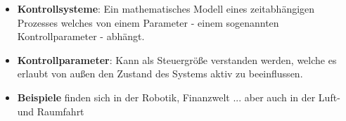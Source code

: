 \documentclass{beamer}
\begin{document}
\begin{frame}
\begin{columns}
				\begin{column}{0.58\textwidth}
					\begin{itemize}
						\item \textbf{Kontrollsysteme}: Ein mathematisches Modell eines zeitabhängigen Prozesses welches von einem Parameter - einem sogenannten Kontrollparameter - abhängt.
						\item \textbf{Kontrollparameter}: Kann als Steuergröße verstanden werden, welche es erlaubt von außen den Zustand des Systems aktiv zu beeinflussen.
						\item \textbf{Beispiele} finden sich in der Robotik, Finanzwelt ... aber auch in der Luft- und Raumfahrt
					\end{itemize}
				\end{column}
			\end{columns}
		\end{frame}
\end{document}
